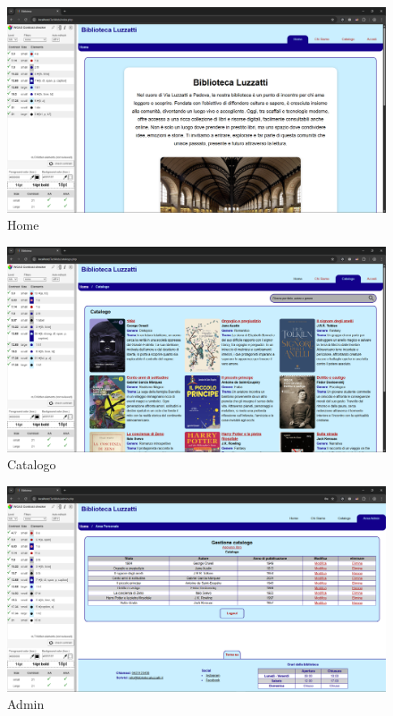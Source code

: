 \documentclass{article}
\begin{document}
\begin{figure}[H]
    \centering
    \includegraphics[width=\textwidth]{img/home.png}
    \caption{Home}
    \label{fig:home.png}
\end{figure}

\begin{figure}[H]
    \centering
    \includegraphics[width=\textwidth]{img/catalogo.png}
    \caption{Catalogo}
    \label{fig:catalogo.png}
\end{figure}

\begin{figure}[H]
    \centering
    \includegraphics[width=\textwidth]{img/admin.png}
    \caption{Admin}
    \label{fig:admin.png}
\end{figure}
\end{document}
